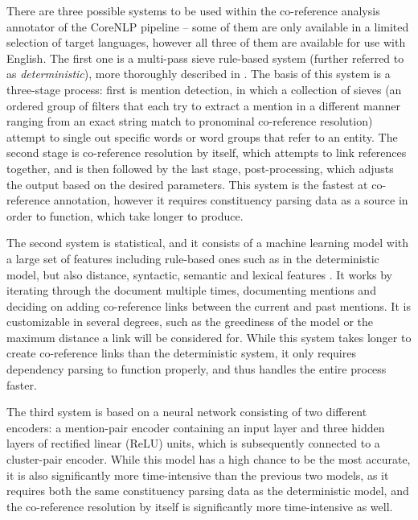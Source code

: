 \documentclass[a4paper, 11pt]{article}
\begin{document}
There are three possible systems to be used within the co-reference analysis annotator of the CoreNLP pipeline -- some of them are only available in a limited selection of target languages, however all three of them are available for use with English. The first one is a multi-pass sieve rule-based system (further referred to as \textit{deterministic}), more thoroughly described in \citet{lee-Etal}. The basis of this system is a three-stage process: first is mention detection, in which a collection of sieves (an ordered group of filters that each try to extract a mention in a different manner ranging from an exact string match to pronominal co-reference resolution) attempt to single out specific words or word groups that refer to an entity. The second stage is co-reference resolution by itself, which attempts to link references together, and is then followed by the last stage, post-processing, which adjusts the output based on the desired parameters. This system is the fastest at co-reference annotation, however it requires constituency parsing data as a source in order to function, which take longer to produce.

The second system is statistical, and it consists of a machine learning model with a large set of features including rule-based ones such as in the deterministic model, but also distance, syntactic, semantic and lexical features \citep{clark2015entity}. It works by iterating through the document multiple times, documenting mentions and deciding on adding co-reference links between the current and past mentions. It is customizable in several degrees, such as the greediness of the model or the maximum distance a link will be considered for. While this system takes longer to create co-reference links than the deterministic system, it only requires dependency parsing to function properly, and thus handles the entire process faster.

The third system is based on a neural network consisting of two different encoders: a mention-pair encoder containing an input layer and three hidden layers of rectified linear (ReLU) units, which is subsequently connected to a cluster-pair encoder. While this model has a high chance to be the most accurate, it is also significantly more time-intensive than the previous two models, as it requires both the same constituency parsing data as the deterministic model, and the co-reference resolution by itself is significantly more time-intensive as well.
\end{document}
